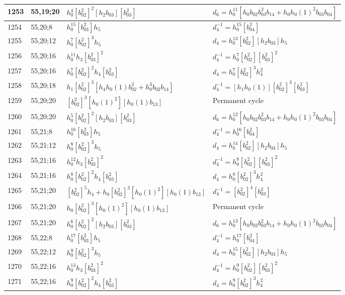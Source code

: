 \documentclass{article}
\begin{document}
\begin{longtable}{|l|l|>{\raggedright\arraybackslash}p{6cm}|>{\raggedright\arraybackslash}p{6cm}|}
\hline
1253 & 55,19;20 & $h_0^4[b_{02}^2]^2[h_2b_{03}][b_{03}^2]$ &$d_{6}=h_0^{11}[h_0b_{02}b_{03}^2b_{14} + h_0h_0(1)^2b_{03}b_{04}]$\\
\hline
1254 & 55,20;8 & $h_0^{15}[b_{03}^2]h_5$ & $d_{4}^{-1}=h_0^{15}[b_{04}^2]$\\
\hline
1255 & 55,20;12 & $h_0^7[b_{02}^2]^3h_5$ &$d_{4}=h_0^{13}[b_{02}^2][h_2b_{03}]h_5$\\
\hline
1256 & 55,20;16 & $h_0^{11}h_3[b_{03}^2]^2$ & $d_{4}^{-1}=h_0^7[b_{02}^2][b_{03}^2]^2$\\
1257 & 55,20;16 & $h_0^7[b_{02}^2]^2h_4[b_{03}^2]$ &$d_{4}=h_0^7[b_{02}^2]^3h_4^2$\\
\hline
1258 & 55,20;18 & $h_1[b_{02}^2]^3[h_4h_0(1)b_{02}^2 + h_0^3b_{02}b_{14}]$ & $d_{4}^{-1}=[h_1h_0(1)][b_{02}^2]^3[b_{03}^2]$\\
\hline
1259 & 55,20;20 & $[b_{02}^2]^3[h_0(1)^2][h_0(1)b_{13}]$ & Permanent cycle\\
1260 & 55,20;20 & $h_0^5[b_{02}^2]^2[h_2b_{03}][b_{03}^2]$ &$d_{6}=h_0^{12}[h_0b_{02}b_{03}^2b_{14} + h_0h_0(1)^2b_{03}b_{04}]$\\
\hline
1261 & 55,21;8 & $h_0^{16}[b_{03}^2]h_5$ & $d_{4}^{-1}=h_0^{16}[b_{04}^2]$\\
\hline
1262 & 55,21;12 & $h_0^8[b_{02}^2]^3h_5$ &$d_{4}=h_0^{14}[b_{02}^2][h_2b_{03}]h_5$\\
\hline
1263 & 55,21;16 & $h_0^{12}h_3[b_{03}^2]^2$ & $d_{4}^{-1}=h_0^8[b_{02}^2][b_{03}^2]^2$\\
1264 & 55,21;16 & $h_0^8[b_{02}^2]^2h_4[b_{03}^2]$ &$d_{4}=h_0^8[b_{02}^2]^3h_4^2$\\
\hline
1265 & 55,21;20 & $[b_{02}^2]^5h_4 + h_0[b_{02}^2]^3[h_0(1)^2][h_0(1)b_{13}]$ & $d_{4}^{-1}=[b_{02}^2]^4[b_{03}^2]$\\
1266 & 55,21;20 & $h_0[b_{02}^2]^3[h_0(1)^2][h_0(1)b_{13}]$ & Permanent cycle\\
1267 & 55,21;20 & $h_0^6[b_{02}^2]^2[h_2b_{03}][b_{03}^2]$ &$d_{6}=h_0^{13}[h_0b_{02}b_{03}^2b_{14} + h_0h_0(1)^2b_{03}b_{04}]$\\
\hline
1268 & 55,22;8 & $h_0^{17}[b_{03}^2]h_5$ & $d_{4}^{-1}=h_0^{17}[b_{04}^2]$\\
\hline
1269 & 55,22;12 & $h_0^9[b_{02}^2]^3h_5$ &$d_{4}=h_0^{15}[b_{02}^2][h_2b_{03}]h_5$\\
\hline
1270 & 55,22;16 & $h_0^{13}h_3[b_{03}^2]^2$ & $d_{4}^{-1}=h_0^9[b_{02}^2][b_{03}^2]^2$\\
1271 & 55,22;16 & $h_0^9[b_{02}^2]^2h_4[b_{03}^2]$ &$d_{4}=h_0^9[b_{02}^2]^3h_4^2$\\

\end{longtable}
\end{document}
